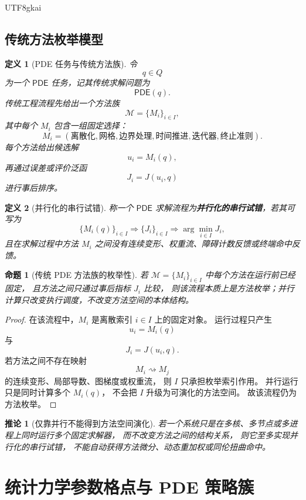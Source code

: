 \documentclass[12pt]{article}
\newtheorem{definition}{定义}[section]
\newtheorem{proposition}{命题}[section]
\newtheorem{corollary}{推论}[section]
\newcommand{\PDE}{\mathsf{PDE}}
\begin{document}
\begin{CJK*}{UTF8}{gkai}
\subsection{传统方法枚举模型}
\label{subsec:tex53-enumeration}

\begin{definition}[PDE 任务与传统方法族]
令
\[
  q\in Q
\]
为一个 \(\PDE\) 任务，记其传统求解问题为
\[
  \PDE(q).
\]
传统工程流程先给出一个方法族
\[
  \mathcal M=\{M_i\}_{i\in I},
\]
其中每个 \(M_i\) 包含一组固定选择：
\[
  M_i
  =
  (\text{离散化},\text{网格},\text{边界处理},\text{时间推进},\text{迭代器},\text{终止准则}).
\]
每个方法给出候选解
\[
  u_i=M_i(q),
\]
再通过误差或评价泛函
\[
  J_i=J(u_i,q)
\]
进行事后排序。
\end{definition}

\begin{definition}[并行化的串行试错]
称一个 \(\PDE\) 求解流程为\textbf{并行化的串行试错}，若其可写为
\[
  \{M_i(q)\}_{i\in I}
  \Longrightarrow
  \{J_i\}_{i\in I}
  \Longrightarrow
  \arg\min_{i\in I}J_i,
\]
且在求解过程中方法 \(M_i\) 之间没有连续变形、权重流、障碍计数反馈或终端命中反馈。
\end{definition}

\begin{proposition}[传统 PDE 方法族的枚举性]
\label{prop:tex53-enumeration}
若 \(\mathcal M=\{M_i\}_{i\in I}\) 中每个方法在运行前已经固定，
且方法之间只通过事后指标 \(J_i\) 比较，
则该流程本质上是方法枚举；并行计算只改变执行调度，不改变方法空间的本体结构。
\end{proposition}

\begin{proof}
在该流程中，\(M_i\) 是离散索引 \(i\in I\) 上的固定对象。
运行过程只产生
\[
  u_i=M_i(q)
\]
与
\[
  J_i=J(u_i,q).
\]
若方法之间不存在映射
\[
  M_i\rightsquigarrow M_j
\]
的连续变形、局部导数、图梯度或权重流，
则 \(I\) 只承担枚举索引作用。
并行运行只是同时计算多个 \(M_i(q)\)，
不会把 \(I\) 升级为可演化的方法空间。
故该流程仍为方法枚举。
\end{proof}

\begin{corollary}[仅靠并行不能得到方法空间演化]
若一个系统只是在多核、多节点或多进程上同时运行多个固定求解器，
而不改变方法之间的结构关系，
则它至多实现并行化的串行试错，
不能自动获得方法微分、动态重加权或同伦扭曲命中。
\end{corollary}

\section{统计力学参数格点与 PDE 策略簇}
\label{sec:tex53-lattice}


\end{CJK*}
\end{document}

